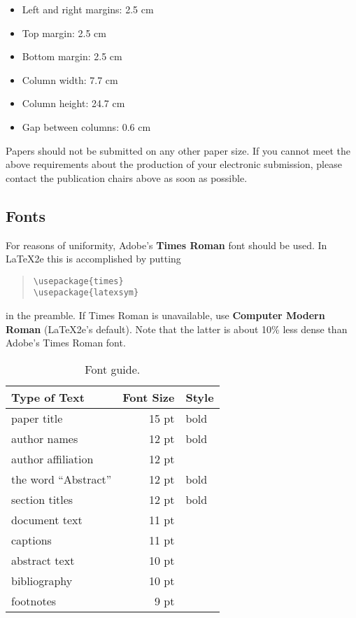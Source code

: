 \documentclass[11pt,a4paper]{article}
\begin{document}
\begin{itemize}
\item Left and right margins: 2.5 cm
\item Top margin: 2.5 cm
\item Bottom margin: 2.5 cm
\item Column width: 7.7 cm
\item Column height: 24.7 cm
\item Gap between columns: 0.6 cm
\end{itemize}

\noindent Papers should not be submitted on any other paper size.
 If you cannot meet the above requirements about the production of 
 your electronic submission, please contact the publication chairs 
 above as soon as possible.

\subsection{Fonts}

For reasons of uniformity, Adobe's {\bf Times Roman} font should be
used. In \LaTeX2e{} this is accomplished by putting

\begin{quote}
\begin{verbatim}
\usepackage{times}
\usepackage{latexsym}
\end{verbatim}
\end{quote}
in the preamble. If Times Roman is unavailable, use {\bf Computer
  Modern Roman} (\LaTeX2e{}'s default).  Note that the latter is about
  10\% less dense than Adobe's Times Roman font.

\begin{table}[h]
\begin{center}
\begin{tabular}{|l|rl|}
\hline \bf Type of Text & \bf Font Size & \bf Style \\ \hline
paper title & 15 pt & bold \\
author names & 12 pt & bold \\
author affiliation & 12 pt & \\
the word ``Abstract'' & 12 pt & bold \\
section titles & 12 pt & bold \\
document text & 11 pt  &\\
captions & 11 pt & \\
abstract text & 10 pt & \\
bibliography & 10 pt & \\
footnotes & 9 pt & \\
\hline
\end{tabular}
\end{center}
\caption{\label{font-table} Font guide. }
\end{table}
\end{document}
